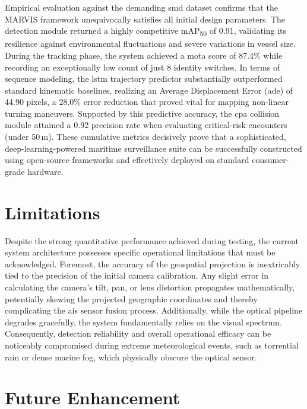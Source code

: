 Empirical evaluation against the demanding \gls{smd} dataset confirms that the MARVIS framework unequivocally satisfies all initial design parameters. The detection module returned a highly competitive mAP\textsubscript{50} of 0.91, validating its resilience against environmental fluctuations and severe variations in vessel size. During the tracking phase, the system achieved a \gls{mota} score of 87.4\% while recording an exceptionally low count of just 8 identity switches. In terms of sequence modeling, the \gls{lstm} trajectory predictor substantially outperformed standard kinematic baselines, realizing an Average Displacement Error (\gls{ade}) of 44.90 pixels, a 28.0\% error reduction that proved vital for mapping non-linear turning maneuvers. Supported by this predictive accuracy, the \gls{cpa} collision module attained a 0.92 precision rate when evaluating critical-risk encounters (under 50\,m). These cumulative metrics decisively prove that a sophisticated, deep-learning-powered maritime surveillance suite can be successfully constructed using open-source frameworks and effectively deployed on standard consumer-grade hardware.

\section{Limitations}

Despite the strong quantitative performance achieved during testing, the current system architecture possesses specific operational limitations that must be acknowledged. Foremost, the accuracy of the geospatial projection is inextricably tied to the precision of the initial camera calibration. Any slight error in calculating the camera's tilt, pan, or lens distortion propagates mathematically, potentially skewing the projected geographic coordinates and thereby complicating the \gls{ais} sensor fusion process. Additionally, while the optical pipeline degrades gracefully, the system fundamentally relies on the visual spectrum. Consequently, detection reliability and overall operational efficacy can be noticeably compromised during extreme meteorological events, such as torrential rain or dense marine fog, which physically obscure the optical sensor.

\section{Future Enhancement}

